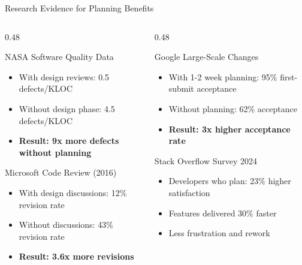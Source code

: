 \documentclass[aspectratio=169,10pt]{beamer}
\begin{document}
\begin{frame}{Research Evidence for Planning Benefits}
    \begin{columns}[T]
        \begin{column}{0.48\textwidth}
            \begin{exampleblock}{NASA Software Quality Data}
                \begin{itemize}
                    \item With design reviews: 0.5 defects/KLOC
                    \item Without design phase: 4.5 defects/KLOC
                    \item \textbf{Result: 9x more defects without planning}
                \end{itemize}
            \end{exampleblock}
            \vspace{0.2cm}
            \begin{exampleblock}{Microsoft Code Review (2016)}
                \begin{itemize}
                    \item With design discussions: 12\% revision rate
                    \item Without discussions: 43\% revision rate
                    \item \textbf{Result: 3.6x more revisions}
                \end{itemize}
            \end{exampleblock}
        \end{column}
        \begin{column}{0.48\textwidth}
            \begin{exampleblock}{Google Large-Scale Changes}
                \begin{itemize}
                    \item With 1-2 week planning: 95\% first-submit acceptance
                    \item Without planning: 62\% acceptance
                    \item \textbf{Result: 3x higher acceptance rate}
                \end{itemize}
            \end{exampleblock}
            \vspace{0.2cm}
            \begin{exampleblock}{Stack Overflow Survey 2024}
                \begin{itemize}
                    \item Developers who plan: 23\% higher satisfaction
                    \item Features delivered 30\% faster
                    \item Less frustration and rework
                \end{itemize}
            \end{exampleblock}
        \end{column}
    \end{columns}


\end{frame}
\end{document}
